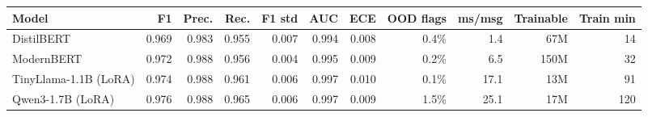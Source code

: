 \begin{tabular}{lrrrrrrrrrr}
\toprule
Model & F1 & Prec. & Rec. & F1 std & AUC & ECE & OOD flags & ms/msg & Trainable & Train min \\
\midrule
DistilBERT & 0.969 & 0.983 & 0.955 & 0.007 & 0.994 & 0.008 & 0.4\% & 1.4 & 67M & 14 \\
ModernBERT & 0.972 & 0.988 & 0.956 & 0.004 & 0.995 & 0.009 & 0.2\% & 6.5 & 150M & 32 \\
TinyLlama-1.1B (LoRA) & 0.974 & 0.988 & 0.961 & 0.006 & 0.997 & 0.010 & 0.1\% & 17.1 & 13M & 91 \\
Qwen3-1.7B (LoRA) & 0.976 & 0.988 & 0.965 & 0.006 & 0.997 & 0.009 & 1.5\% & 25.1 & 17M & 120 \\
\bottomrule
\end{tabular}
